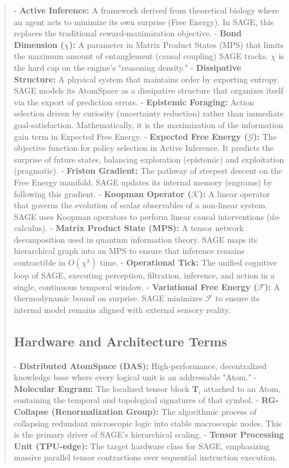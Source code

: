 \documentclass[10pt,twocolumn,letterpaper]{article}
\begin{document}
\begin{abstract}
- \textbf{Active Inference:} A framework derived from theoretical biology where an agent acts to minimize its own surprise (Free Energy). In SAGE, this replaces the traditional reward-maximization objective.
- \textbf{Bond Dimension ($\chi$):} A parameter in Matrix Product States (MPS) that limits the maximum amount of entanglement (causal coupling) SAGE tracks. $\chi$ is the hard cap on the engine's "reasoning density."
- \textbf{Dissipative Structure:} A physical system that maintains order by exporting entropy. SAGE models its AtomSpace as a dissipative structure that organizes itself via the export of prediction errors.
- \textbf{Epistemic Foraging:} Action selection driven by curiosity (uncertainty reduction) rather than immediate goal-satisfaction. Mathematically, it is the maximization of the information gain term in Expected Free Energy.
- \textbf{Expected Free Energy ($\mathcal{G}$):} The objective function for policy selection in Active Inference. It predicts the surprise of future states, balancing exploration (epistemic) and exploitation (pragmatic).
- \textbf{Friston Gradient:} The pathway of steepest descent on the Free Energy manifold. SAGE updates its internal memory (engrams) by following this gradient.
- \textbf{Koopman Operator ($\mathcal{K}$):} A linear operator that governs the evolution of scalar observables of a non-linear system. SAGE uses Koopman operators to perform linear causal interventions ($do$-calculus).
- \textbf{Matrix Product State (MPS):} A tensor network decomposition used in quantum information theory. SAGE maps its hierarchical graph into an MPS to ensure that inference remains contractible in $O(\chi^3)$ time.
- \textbf{Operational Tick:} The unified cognitive loop of SAGE, executing perception, filtration, inference, and action in a single, continuous temporal window.
- \textbf{Variational Free Energy ($\mathcal{F}$):} A thermodynamic bound on surprise. SAGE minimizes $\mathcal{F}$ to ensure its internal model remains aligned with external sensory reality.

\subsection{Hardware and Architecture Terms}

- \textbf{Distributed AtomSpace (DAS):} High-performance, decentralized knowledge base where every logical unit is an addressable "Atom."
- \textbf{Molecular Engram:} The localized tensor block $\mathbf{T}_i$ attached to an Atom, containing the temporal and topological signatures of that symbol.
- \textbf{RG-Collapse (Renormalization Group):} The algorithmic process of collapsing redundant microscopic logic into stable macroscopic nodes. This is the primary driver of SAGE's hierarchical scaling.
- \textbf{Tensor Processing Unit (TPU-edge):} The target hardware class for SAGE, emphasizing massive parallel tensor contractions over sequential instruction execution.



\end{abstract}
\end{document}
